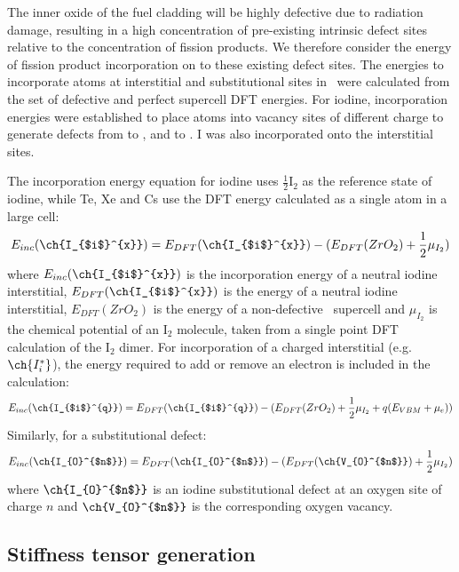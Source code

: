 The inner oxide of the fuel cladding will be highly defective due to radiation damage, resulting in a high concentration of pre-existing intrinsic defect sites relative to the concentration of fission products. We therefore consider the energy of fission product incorporation on to these existing defect sites. The energies to incorporate atoms at interstitial and substitutional sites in \zirconia\ were calculated from the set of defective and perfect supercell DFT energies. For iodine, incorporation energies were established to place atoms into vacancy sites of different charge to generate defects from  to , and  to . I was also incorporated onto the interstitial sites.

The incorporation energy equation for iodine uses $\frac{1}{2}$I$_{2}$ as the reference state of iodine, while Te, Xe and Cs use the DFT energy calculated as a single atom in a large cell:
\begin{equation}
\label{interstitial_incorp_equation}
E_{inc}(\ch{I_{$i$}^{x}}) = E_{DFT}(\ch{I_{$i$}^{x}}) - (E_{DFT}(ZrO_2) + \frac{1}{2}\mu_{I_{2}})  %
\end{equation}
where $E_{inc}(\ch{I_{$i$}^{x}})$ is the incorporation energy of a neutral iodine interstitial, $E_{DFT}(\ch{I_{$i$}^{x}})$ is the energy of a neutral iodine interstitial, $E_{DFT}(ZrO_2)$ is the energy of a non-defective \zirconia\ supercell and $\mu_{I_{2}}$ is the chemical potential of an I$_{2}$ molecule, taken from a single point DFT calculation of the I$_{2}$ dimer. For incorporation of a charged interstitial (e.g. $\ch{I_{i}^{*}}$), the energy required to add or remove an electron is included in the calculation:
\begin{equation}
\label{interstitial_incorp_equation_charged}
E_{inc}(\ch{I_{$i$}^{q}}) = E_{DFT}(\ch{I_{$i$}^{q}}) - (E_{DFT}(ZrO_2) + \frac{1}{2}\mu_{I_{2}} + q(E_{VBM} + \mu_{e}))
\end{equation}
Similarly, for a substitutional defect:
\begin{equation}
\label{o_sub_incorp_equation}
E_{inc}(\ch{I_{O}^{$n$}}) = E_{DFT}(\ch{I_{O}^{$n$}}) - (E_{DFT}(\ch{V_{O}^{$n$}}) + \frac{1}{2}\mu_{I_{2}})  %
\end{equation}
where $\ch{I_{O}^{$n$}}$ is an iodine substitutional defect at an oxygen site of charge $n$ and $\ch{V_{O}^{$n$}}$ is the corresponding oxygen vacancy.

\subsection{Stiffness tensor generation}

